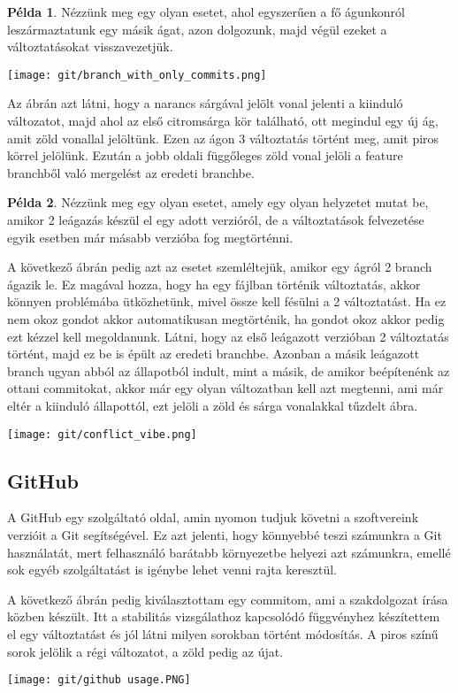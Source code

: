 \documentclass{article}
\theoremstyle{definition}
\theoremstyle{theorem}
\newtheorem{example}{Példa}
\begin{document}
\begin{example}
Nézzünk meg egy olyan esetet, ahol egyszerűen a fő águnkonról leszármaztatunk egy másik ágat, azon dolgozunk, majd végül ezeket a változtatásokat visszavezetjük.
\begin{center}
    \texttt{[image: git/branch\_with\_only\_commits.png]}
\end{center}
\end{example}

Az ábrán azt látni, hogy a narancs sárgával jelölt vonal jelenti a kiinduló változatot, majd ahol az első citromsárga kör található, ott megindul egy új ág, amit zöld vonallal jelöltünk. Ezen az ágon 3 változtatás történt meg, amit piros körrel jelölünk. Ezután a jobb oldali függőleges zöld vonal jelöli a feature branchből való mergelést az eredeti branchbe.


\begin{example}
Nézzünk meg egy olyan esetet, amely egy olyan helyzetet mutat be, amikor 2 leágazás készül el egy adott verzióról, de a változtatások felvezetése egyik esetben már másabb verzióba fog megtörténni.
\end{example}
A következő ábrán pedig azt az esetet szemléltejük, amikor egy ágról 2 branch ágazik le. Ez magával hozza, hogy ha egy fájlban történik változtatás, akkor könnyen problémába ütközhetünk, mivel össze kell fésülni a 2 változtatást. Ha ez nem okoz gondot akkor automatikusan megtörténik, ha gondot okoz akkor pedig ezt kézzel kell megoldanunk. Látni, hogy az első leágazott verzióban 2 változtatás történt, majd ez be is épült az eredeti branchbe. Azonban a másik leágazott branch ugyan abból az állapotból indult, mint a másik, de amikor beépítenénk az ottani commitokat, akkor már egy olyan változatban kell azt megtenni, ami már eltér a kiinduló állapottól, ezt jelöli a zöld és sárga vonalakkal tűzdelt ábra.

\begin{center}
    \texttt{[image: git/conflict\_vibe.png]}
\end{center}
\subsection{GitHub}
A GitHub egy szolgáltató oldal, amin nyomon tudjuk követni a szoftvereink verzióit a Git segítségével. Ez azt jelenti, hogy könnyebbé teszi számunkra a Git használatát, mert felhasználó barátabb környezetbe helyezi azt számunkra, emellé sok egyéb szolgáltatást is igénybe lehet venni rajta keresztül.

A következő ábrán pedig kiválasztottam egy commitom, ami a szakdolgozat írása közben készült. Itt a stabilitás vizsgálathoz kapcsolódó függvényhez készítettem el egy változtatást és jól látni milyen sorokban történt módosítás. A piros színű sorok jelölik a régi változatot, a zöld pedig  az újat.
\begin{center}
    \texttt{[image: git/github usage.PNG]}
\end{center}



\end{document}

